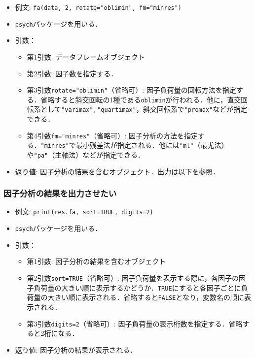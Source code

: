 \documentclass[
  xelatex, ja=standard]{bxjsarticle}
\providecommand{\tightlist}{%
  \setlength{\itemsep}{0pt}\setlength{\parskip}{0pt}}
\begin{document}
\begin{itemize}
\tightlist
\item
  例文: \texttt{fa(data,\ 2,\ rotate="oblimin",\ fm="minres")}
\item
  \texttt{psych}パッケージを用いる．
\item
  引数：

  \begin{itemize}
  \tightlist
  \item
    第1引数: データフレームオブジェクト
  \item
    第2引数: 因子数を指定する．
  \item
    第3引数\texttt{rotate="oblimin"}（省略可）:
    因子負荷量の回転方法を指定する．省略すると斜交回転の1種である\texttt{oblimin}が行われる．他に，直交回転系として\texttt{"varimax"},
    \texttt{"quartimax"}，斜交回転系で\texttt{"promax"}などが指定できる．
  \item
    第4引数\texttt{fm="minres"}（省略可）:
    因子分析の方法を指定する．\texttt{"minres"}で最小残差法が指定される．他には\texttt{"ml"}（最尤法）や\texttt{"pa"}（主軸法）などが指定できる．
  \end{itemize}
\item
  返り値: 因子分析の結果を含むオブジェクト．出力は以下を参照．
\end{itemize}

\subsubsection{因子分析の結果を出力させたい}\label{ux56e0ux5b50ux5206ux6790ux306eux7d50ux679cux3092ux51faux529bux3055ux305bux305fux3044}

\begin{itemize}
\tightlist
\item
  例文: \texttt{print(res.fa,\ sort=TRUE,\ digits=2)}
\item
  \texttt{psych}パッケージを用いる．
\item
  引数：

  \begin{itemize}
  \tightlist
  \item
    第1引数: 因子分析の結果を含むオブジェクト
  \item
    第2引数\texttt{sort=TRUE}（省略可）:
    因子負荷量を表示する際に，各因子の因子負荷量の大きい順に表示するかどうか．\texttt{TRUE}にすると各因子ごとに負荷量の大きい順に表示される．省略すると\texttt{FALSE}となり，変数名の順に表示される．
  \item
    第3引数\texttt{digits=2}（省略可）:
    因子負荷量の表示桁数を指定する．省略すると2桁になる．
  \end{itemize}
\item
  返り値: 因子分析の結果が表示される．
\end{itemize}
\end{document}
